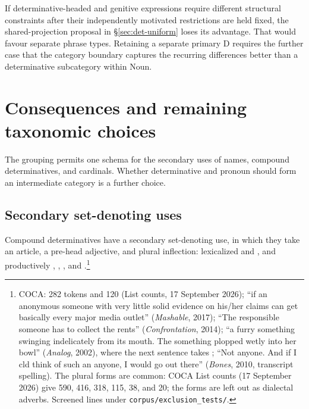 \documentclass[12pt]{article}
\begin{document}
If determinative-headed and genitive expressions require different structural constraints after their independently motivated restrictions are held fixed, the shared-projection proposal in §\ref{sec:det-uniform} loses its advantage. That would favour separate phrase types. Retaining a separate primary D requires the further case that the category boundary captures the recurring differences better than a determinative subcategory within Noun.

\section{Consequences and remaining taxonomic choices}\label{sec:consequences}

The grouping permits one schema for the secondary uses of names, compound determinatives, and cardinals. Whether determinative and pronoun should form an intermediate category is a further choice.

\subsection{Secondary set-denoting uses}\label{sec:secondary-use}

Compound determinatives have a secondary set-denoting use, in which they take an article, a pre-head adjective, and plural inflection: lexicalized  and , and productively , , , and .\footnote{COCA:  282 tokens and  120 (List counts, 17 September 2026); \enquote{if an anonymous someone with very little solid evidence on his/her claims can get basically every major media outlet} (\textit{Mashable}, 2017); \enquote{The responsible someone has to collect the rents} (\textit{Confrontation}, 2014); \enquote{a furry something swinging indelicately from its mouth. The something plopped wetly into her bowl} (\textit{Analog}, 2002), where the next sentence takes ; \enquote{Not anyone. And if I cld think of such an anyone, I would go out there} (\textit{Bones}, 2010, transcript spelling). The plural forms are common: COCA List counts (17 September 2026) give  590,  416,  318,  115,  38, and  20; the  forms are left out as dialectal adverbs. Screened lines under \texttt{corpus/exclusion\_tests/}.}
\end{document}
